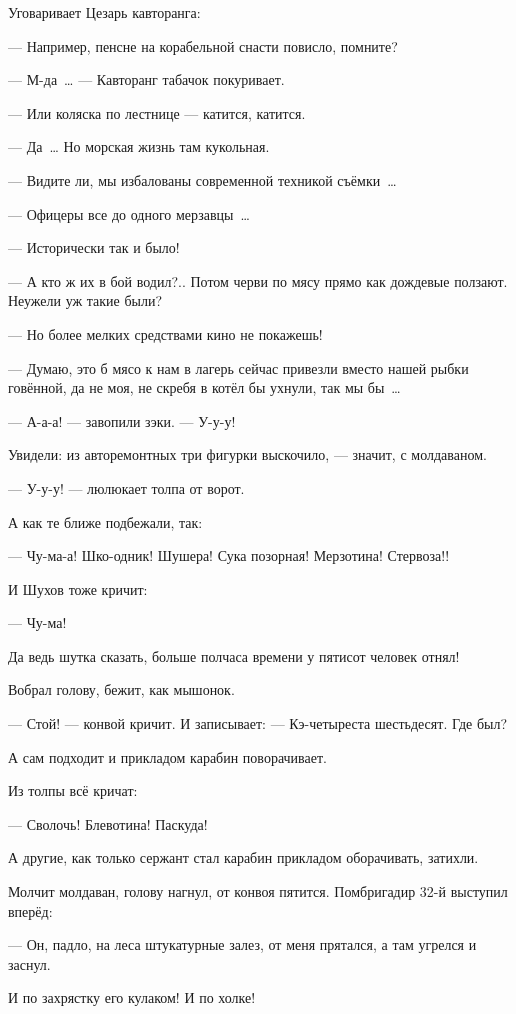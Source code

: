 Уговаривает Цезарь кавторанга:

--- Например, пенсне на корабельной снасти повисло, помните?

--- М-да~\dots{} --- Кавторанг табачок покуривает.

--- Или коляска по лестнице --- катится, катится.

--- Да~\dots{} Но морская жизнь там кукольная.

--- Видите ли, мы избалованы современной техникой съёмки~\dots{}

--- Офицеры все до одного мерзавцы~\dots{}

--- Исторически так и было!

--- А кто ж их в бой водил?.. Потом черви по мясу прямо как дождевые ползают. Неужели уж такие были?

--- Но более мелких средствами кино не покажешь!

--- Думаю, это б мясо к нам в лагерь сейчас привезли вместо нашей рыбки говённой, да не моя, не скребя в котёл бы ухнули, так мы бы~\dots{}

--- А-а-а! --- завопили зэки. --- У-у-у!

Увидели: из авторемонтных три фигурки выскочило, --- значит, с молдаваном.

--- У-у-у! --- люлюкает толпа от ворот.

А как те ближе подбежали, так:

--- Чу-ма-а! Шко-одник! Шушера! Сука позорная! Мерзотина! Стервоза!!

И Шухов тоже кричит:

--- Чу-ма!

Да ведь шутка сказать, больше полчаса времени у пятисот человек отнял!

Вобрал голову, бежит, как мышонок.

--- Стой! --- конвой кричит. И записывает: --- Кэ-четыреста шестьдесят. Где был?

А сам подходит и прикладом карабин поворачивает.

Из толпы всё кричат:

--- Сволочь! Блевотина! Паскуда!

А другие, как только сержант стал карабин прикладом оборачивать, затихли.

Молчит молдаван, голову нагнул, от конвоя пятится. Помбригадир 32-й выступил вперёд:

--- Он, падло, на леса штукатурные залез, от меня прятался, а там угрелся и заснул.

И по захрястку его кулаком! И по холке!


